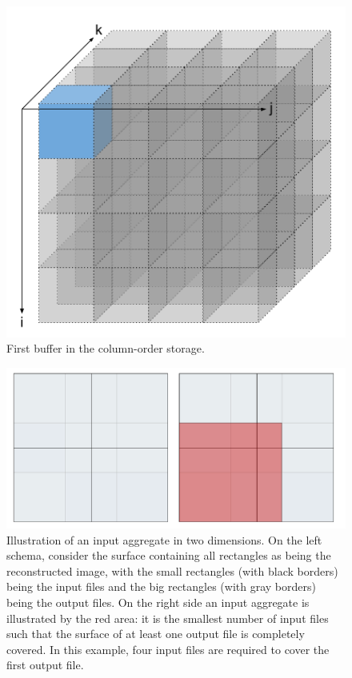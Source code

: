 \documentclass[conference]{IEEEtran}
\begin{document}
\begin{figure}[h]
\centering
\includegraphics[scale=0.2]{./figures/first_buffer.png}
\caption{First buffer in the column-order storage.
}
\label{fig:firstbuffer}
\end{figure}

\begin{figure}[h]
\centering
\includegraphics[scale=0.15]{./figures/input_aggregates.png}
\caption{Illustration of an input aggregate in two dimensions. On the left schema, consider the surface containing all rectangles as being the reconstructed image, with the small rectangles (with black borders) being the input files and the big rectangles (with gray borders) being the output files. On the right side an input aggregate is illustrated by the red area: it is the smallest number of input files such that the surface of at least one output file is completely covered. In this example, four input files are required to cover the first output file.
}
\label{fig:input_aggregates}
\end{figure}
\end{document}
